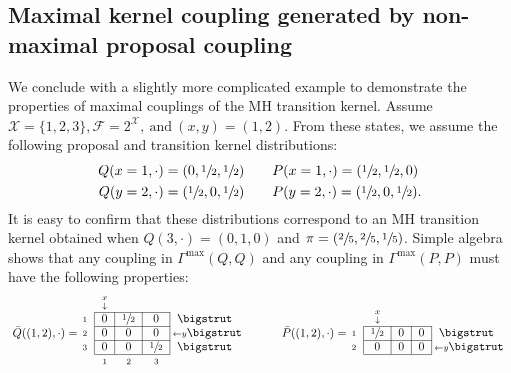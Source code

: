 \documentclass[aihp]{imsart}
\theoremstyle{plain}
\theoremstyle{remark}
\theoremstyle{definition} \newtheorem{example}{Example}
\newcommand{\eq}[1]{\begin{align*}#1\end{align*}} %
\newcommand{\scrF}{\mathscr{F}}
\newcommand{\calX}{\mathcal{X}}
\newcommand{\cd}{\cdot}
\newcommand{\sas}{\ \text{and} \ }
\newcommand{\bp}{\bar P}
\newcommand{\bq}{\bar Q}
\newcommand{\xy}{(x,y)}
\newcommand{\Gmax}{\Gamma^\mathrm{max}}
\newcommand{\h}{\sfrac{1}{2}}
\begin{document}
\begin{appendix}
\subsection{Maximal kernel coupling generated by non-maximal proposal coupling}
\label{ex:nonmax}
We conclude with a slightly more complicated example to demonstrate the properties of maximal
couplings of the MH transition kernel. Assume $\calX = \{1,2,3\}, \scrF = 2^\calX, \sas \xy =
(1,2)$. From these states, we assume the following proposal and transition kernel distributions:
\eq{
	Q(x=1, \cd) = (0,\h,\h) \qquad & P(x=1, \cd) = (\h,\h,0) \\
	Q(y=2,\cd) = (\h,0,\h) \qquad & P(y=2, \cd) = (\h,0,\h).
}
It is easy to confirm that these distributions correspond to an MH transition kernel obtained when
$Q(3, \cd) = (0,1,0)$ and $\pi = (\sfrac{2}{5}, \sfrac{2}{5}, \sfrac{1}{5})$. Simple algebra shows
that any coupling in $\Gmax(Q,Q)$ and any coupling in $\Gmax(P,P)$ must have the following
properties:
\eq{
	\raisebox{3pt}{ $ \bq((1,2), \cd) = $ } \hspace{-5pt}
	\begin{blockarray}{rcccl}
		& {\stackrel{x}{\scriptstyle \downarrow}} & & &  \\
		\begin{block}{ r |c|c|c| l }
			\cline{2-4}
			{\scriptstyle 1} & 0 & \h & 0& \bigstrut \\
			\cline{2-4}
			{\scriptstyle 2} & 0 &0 & 0 & {\hspace{-4pt} \scriptstyle \leftarrow y} \bigstrut  \\
			\cline{2-4}
			{\scriptstyle 3} & 0 & 0 & \h & \bigstrut  \\
			\cline{2-4}
		\end{block}
		\  & {\scriptstyle 1} & {\scriptstyle 2} & {\scriptstyle 3}
	\end{blockarray}
	\hspace{2.5em}
	\raisebox{3pt}{ $ \bp((1,2), \cd) = $ } \hspace{-5pt}	\begin{blockarray}{rcccl}
		& {\stackrel{x}{\scriptstyle \downarrow}} & & &  \\
		\begin{block}{ r |c|c|c| l }
			\cline{2-4}
			{\scriptstyle 1} & \h & 0 & 0 & \bigstrut  \\
			\cline{2-4}
			{\scriptstyle 2} & 0 & 0 & 0 & {\hspace{-4pt} \scriptstyle \leftarrow y}\bigstrut   \\
			\cline{2-4}

\end{block}
\end{blockarray}}
\end{appendix}
\end{document}
